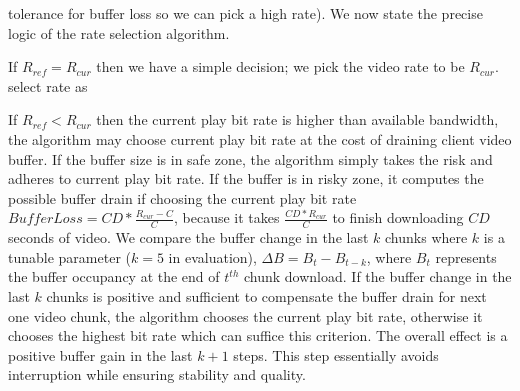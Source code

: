 tolerance for buffer loss so we can pick a high rate).
We now state the precise logic of the rate selection algorithm.



If $R_{ref}= R_{cur}$ then we have a simple decision; we pick the
video rate to be $ R_{cur}$.
select rate as 

If $R_{ref} < R_{cur}$ then the current play bit rate is higher than
available bandwidth, the 
algorithm may choose current play bit rate at the cost of draining
client video buffer. If the buffer size is in safe zone, the
algorithm simply takes the risk and adheres to current play bit rate. If the
buffer is in risky zone, it computes the possible buffer drain if
choosing the current play bit rate $BufferLoss
=CD*\frac{R_{cur}-C}{C}$, because it takes $\frac{CD*R_{cur}}{C}$ to finish downloading 
$CD$ seconds of video. 
We compare the buffer change in
the last $k$ chunks where $k$ is a tunable parameter ($k=5$ in evaluation), 
$\Delta B = B_{t} -B_{t-k}$, where $B_{t}$
represents the buffer occupancy at the end of $t^{th}$ chunk
download. If the buffer change in the last $k$ chunks is positive and
sufficient to compensate the buffer drain for next one video chunk, the
algorithm chooses the current play bit rate, otherwise it chooses the
highest bit rate which can suffice this criterion. 
The overall effect is a positive buffer gain in the last $k+1$ steps.
This step essentially avoids interruption while ensuring stability and quality. 

